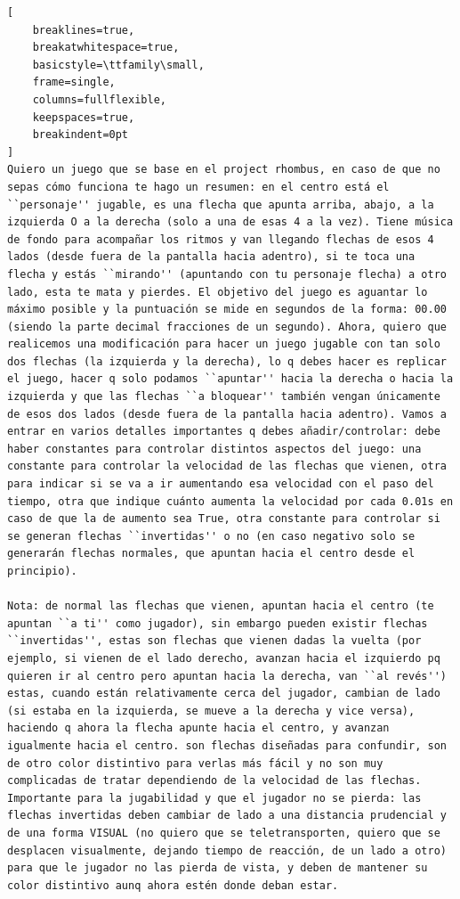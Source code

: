 \begin{lstlisting}[
    breaklines=true,
    breakatwhitespace=true,
    basicstyle=\ttfamily\small,
    frame=single,
    columns=fullflexible,
    keepspaces=true,
    breakindent=0pt
]
Quiero un juego que se base en el project rhombus, en caso de que no sepas cómo funciona te hago un resumen: en el centro está el ``personaje'' jugable, es una flecha que apunta arriba, abajo, a la izquierda O a la derecha (solo a una de esas 4 a la vez). Tiene música de fondo para acompañar los ritmos y van llegando flechas de esos 4 lados (desde fuera de la pantalla hacia adentro), si te toca una flecha y estás ``mirando'' (apuntando con tu personaje flecha) a otro lado, esta te mata y pierdes. El objetivo del juego es aguantar lo máximo posible y la puntuación se mide en segundos de la forma: 00.00 (siendo la parte decimal fracciones de un segundo). Ahora, quiero que realicemos una modificación para hacer un juego jugable con tan solo dos flechas (la izquierda y la derecha), lo q debes hacer es replicar el juego, hacer q solo podamos ``apuntar'' hacia la derecha o hacia la izquierda y que las flechas ``a bloquear'' también vengan únicamente de esos dos lados (desde fuera de la pantalla hacia adentro). Vamos a entrar en varios detalles importantes q debes añadir/controlar: debe haber constantes para controlar distintos aspectos del juego: una constante para controlar la velocidad de las flechas que vienen, otra para indicar si se va a ir aumentando esa velocidad con el paso del tiempo, otra que indique cuánto aumenta la velocidad por cada 0.01s en caso de que la de aumento sea True, otra constante para controlar si se generan flechas ``invertidas'' o no (en caso negativo solo se generarán flechas normales, que apuntan hacia el centro desde el principio).

Nota: de normal las flechas que vienen, apuntan hacia el centro (te apuntan ``a ti'' como jugador), sin embargo pueden existir flechas ``invertidas'', estas son flechas que vienen dadas la vuelta (por ejemplo, si vienen de el lado derecho, avanzan hacia el izquierdo pq quieren ir al centro pero apuntan hacia la derecha, van ``al revés'') estas, cuando están relativamente cerca del jugador, cambian de lado (si estaba en la izquierda, se mueve a la derecha y vice versa), haciendo q ahora la flecha apunte hacia el centro, y avanzan igualmente hacia el centro. son flechas diseñadas para confundir, son de otro color distintivo para verlas más fácil y no son muy complicadas de tratar dependiendo de la velocidad de las flechas. Importante para la jugabilidad y que el jugador no se pierda: las flechas invertidas deben cambiar de lado a una distancia prudencial y de una forma VISUAL (no quiero que se teletransporten, quiero que se desplacen visualmente, dejando tiempo de reacción, de un lado a otro) para que le jugador no las pierda de vista, y deben de mantener su color distintivo aunq ahora estén donde deban estar. 


\end{lstlisting}
